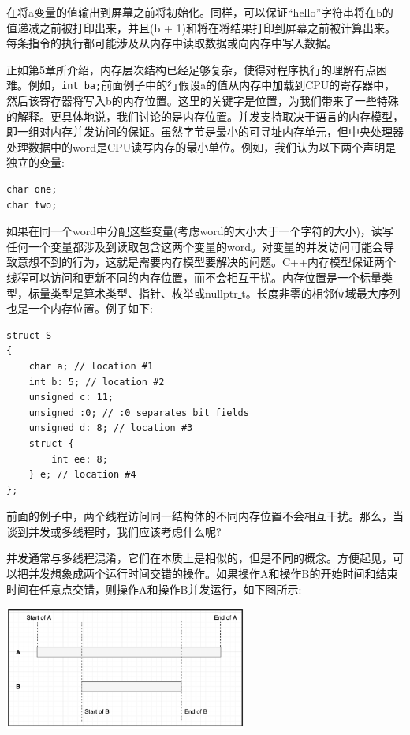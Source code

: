 在将a变量的值输出到屏幕之前将初始化。同样，可以保证“hello”字符串将在b的值递减之前被打印出来，并且(b + 1)和将在将结果打印到屏幕之前被计算出来。每条指令的执行都可能涉及从内存中读取数据或向内存中写入数据。 \par
正如第5章所介绍，内存层次结构已经足够复杂，使得对程序执行的理解有点困难。例如，\texttt{int b{a};}前面例子中的行假设a的值从内存中加载到CPU的寄存器中，然后该寄存器将写入b的内存位置。这里的关键字是位置，为我们带来了一些特殊的解释。更具体地说，我们讨论的是内存位置。并发支持取决于语言的内存模型，即一组对内存并发访问的保证。虽然字节是最小的可寻址内存单元，但中央处理器处理数据中的word是CPU读写内存的最小单位。例如，我们认为以下两个声明是独立的变量: \par

\begin{lstlisting}[caption={}]
char one;
char two;
\end{lstlisting}

如果在同一个word中分配这些变量(考虑word的大小大于一个字符的大小)，读写任何一个变量都涉及到读取包含这两个变量的word。对变量的并发访问可能会导致意想不到的行为，这就是需要内存模型要解决的问题。C++内存模型保证两个线程可以访问和更新不同的内存位置，而不会相互干扰。内存位置是一个标量类型，标量类型是算术类型、指针、枚举或nullptr\underline{ }t。长度非零的相邻位域最大序列也是一个内存位置。例子如下: \par

\begin{lstlisting}[caption={}]
struct S
{
	char a; // location #1
	int b: 5; // location #2
	unsigned c: 11;
	unsigned :0; // :0 separates bit fields
	unsigned d: 8; // location #3
	struct {
		int ee: 8;
	} e; // location #4
};
\end{lstlisting}

前面的例子中，两个线程访问同一结构体的不同内存位置不会相互干扰。那么，当谈到并发或多线程时，我们应该考虑什么呢? \par
并发通常与多线程混淆，它们在本质上是相似的，但是不同的概念。方便起见，可以把并发想象成两个运行时间交错的操作。如果操作A和操作B的开始时间和结束时间在任意点交错，则操作A和操作B并发运行，如下图所示: \par

\begin{center}
	\includegraphics[width=0.6\textwidth]{content/Section-2/Chapter-8/1}
\end{center}

